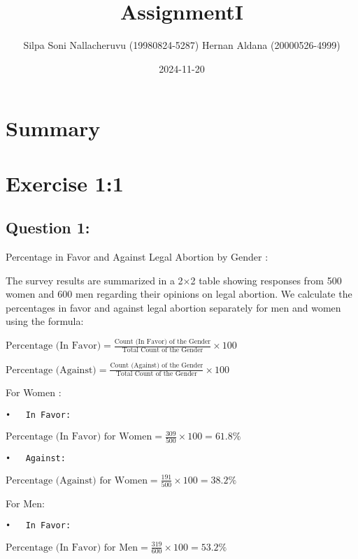 \documentclass[
]{article}
\title{AssignmentI}
\author{Silpa Soni Nallacheruvu (19980824-5287) Hernan Aldana
(20000526-4999)}
\date{2024-11-20}
\begin{document}
\maketitle

\section{Summary}\label{summary}

\section{Exercise 1:1}\label{exercise-11}

\subsection{Question 1:}\label{question-1}

Percentage in Favor and Against Legal Abortion by Gender :

The survey results are summarized in a 2×2 table showing responses from
500 women and 600 men regarding their opinions on legal abortion. We
calculate the percentages in favor and against legal abortion separately
for men and women using the formula:

\({\text{Percentage (In Favor)} = \frac{\text{Count (In Favor) of the Gender}}{\text{Total Count of the Gender}} \times 100}\)

\({\text{Percentage (Against)} = \frac{\text{Count (Against) of the Gender}}{\text{Total Count of the Gender}} \times 100}\)

For Women :

\begin{verbatim}
•   In Favor:
\end{verbatim}

\({\text{Percentage (In Favor) for Women} = \frac{309}{500} \times 100 = 61.8\%}\)

\begin{verbatim}
•   Against:
\end{verbatim}

\({\text{Percentage (Against) for Women} = \frac{191}{500} \times 100 = 38.2\%}\)

For Men:

\begin{verbatim}
•   In Favor:
\end{verbatim}

\({\text{Percentage (In Favor) for Men} = \frac{319}{600} \times 100 = 53.2\%}\)
\end{document}
